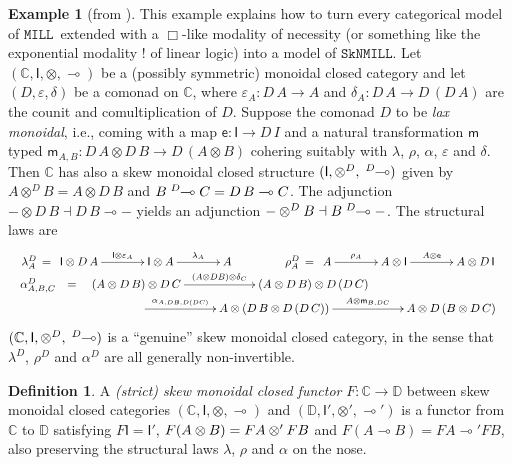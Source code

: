 \documentclass[copyright,creativecommons]{eptcs}
\theoremstyle{definition}
\newtheorem{defn}{Definition}[section]
\newtheorem{example}{Example}[section]
\newcommand{\ot}{\otimes}
\newcommand{\lolli}{\multimap}
\newcommand{\I}{\mathsf{I}}
\newcommand{\otd}{\ot^D}
\newcommand{\lollid}{\;\textsuperscript{$D$}\!\!\lolli}
\newcommand{\MILL}{$\mathtt{MILL}$}
\newcommand{\SkNMILL}{$\mathtt{SkNMILL}$}
\begin{document}
\begin{example}[from \cite{uustalu:eilenberg-kelly:2020}]
This example explains how to turn every categorical model of \MILL\ extended with a $\Box$-like modality of necessity (or something like the exponential modality $!$ of linear logic) into a model of \SkNMILL.
Let $(\mathbb{C},\I,\ot,\lolli)$ be a (possibly symmetric) monoidal closed category and let $(D,\varepsilon, \delta)$ be a comonad on $\mathbb{C}$, where $\varepsilon_A : D\,A \to A$ and $\delta_A : D\,A \to D\,(D\,A)$ are the counit and comultiplication of $D$. Suppose the comonad $D$ to be \emph{lax monoidal}, i.e., coming with a map $\mathsf{e} : \I \to D\,I$ and a natural transformation $\mathsf{m}$ typed $\mathsf{m}_{A,B} : D \,A \ot D\,B \to D\,(A \ot B)$ cohering suitably with $\lambda$, $\rho$, $\alpha$, $\varepsilon$ and $\delta$.
Then $\mathbb{C}$ has also a skew monoidal closed structure $(\I, \otd, \lollid)$ given by  $A \otd B = A \ot D\,B$ and $B \lollid C = D\,B \lolli C$. The adjunction ${-} \ot D\,B \dashv D\,B \lolli {-}$ yields an adjunction ${-} \otd B \dashv B \lollid {-}$. The structural laws are
\[
\begin{array}{c}
\lambda^D_A \, = \, \xymatrix@C=3pc{\I \ot D\,A \ar[r]^-{\I \ot \varepsilon_A} & \I \ot A \ar[r]^-{\lambda_A} & A}
\hspace*{1.5cm}
\rho^D_A \, = \, \xymatrix@C=3pc{A \ar[r]^-{\rho_A} & A \ot \I \ar[r]^-{A \ot \mathsf{e}} & A \ot D\,\I}
\\
\begin{array}{rcl}
\alpha^D_{A,B,C} & = & \xymatrix@C=5pc{(A \ot D\,B) \ot D\,C
                   \ar[r]^-{(A \ot D B) \ot \delta_C}
                   & (A \ot D\,B) \ot D\,(D\,C)} \\
& & \hspace*{1.5cm} \xymatrix@C=5pc{\ar[r]^-{\alpha_{A,DB,D(DC)}}
                  & A \ot (D\,B \ot D\,(D\,C)) \ar[r]^-{A \ot \mathsf{m}_{B,DC}}
                  & A \ot D\,(B \ot D\,C)}
\end{array}
\end{array}
\]
$(\mathbb{C},\I,\otd,\lollid)$  is a ``genuine'' skew monoidal closed category, in the sense that $\lambda^D$, $\rho^D$ and $\alpha^D$ are all generally non-invertible.
\end{example}

\begin{defn}
  A \emph{(strict) skew monoidal closed functor} $F : \mathbb{C} \rightarrow \mathbb{D}$ between skew monoidal closed categories $(\mathbb{C} , \I , \ot , \lolli)$ and $(\mathbb{D} , \I' , \ot' , \lolli')$ is a functor from $\mathbb{C}$ to $\mathbb{D}$ satisfying
    $F \I = \I'$, $F (A \ot B) = \linebreak F A \ot' F B$ and
    $F(A \lolli B) = F A \lolli' F B$, also preserving the structural laws $\lambda$, $\rho$ and $\alpha$ on the nose.
\end{defn}
\end{document}
